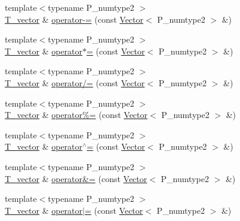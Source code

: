 \begin{DoxyCompactItemize}
\item 
{\footnotesize template$<$typename P\+\_\+numtype2 $>$ }\\\hyperlink{classTinyVector_aea08e4463006acf6842a93c026b27094}{T\+\_\+vector} \& \hyperlink{classTinyVector_ac94a05d4ad1b0984491aff7d99361f70}{operator-\/=} (const \hyperlink{classVector}{Vector}$<$ P\+\_\+numtype2 $>$ \&)
\item 
{\footnotesize template$<$typename P\+\_\+numtype2 $>$ }\\\hyperlink{classTinyVector_aea08e4463006acf6842a93c026b27094}{T\+\_\+vector} \& \hyperlink{classTinyVector_adc3770c333ef37d1e108a2470d3236f6}{operator$\ast$=} (const \hyperlink{classVector}{Vector}$<$ P\+\_\+numtype2 $>$ \&)
\item 
{\footnotesize template$<$typename P\+\_\+numtype2 $>$ }\\\hyperlink{classTinyVector_aea08e4463006acf6842a93c026b27094}{T\+\_\+vector} \& \hyperlink{classTinyVector_a18d3f9a7e30491c3a631a4b5ce657e62}{operator/=} (const \hyperlink{classVector}{Vector}$<$ P\+\_\+numtype2 $>$ \&)
\item 
{\footnotesize template$<$typename P\+\_\+numtype2 $>$ }\\\hyperlink{classTinyVector_aea08e4463006acf6842a93c026b27094}{T\+\_\+vector} \& \hyperlink{classTinyVector_addb9fdffcb8e617ce5fbd2da26d948f1}{operator\%=} (const \hyperlink{classVector}{Vector}$<$ P\+\_\+numtype2 $>$ \&)
\item 
{\footnotesize template$<$typename P\+\_\+numtype2 $>$ }\\\hyperlink{classTinyVector_aea08e4463006acf6842a93c026b27094}{T\+\_\+vector} \& \hyperlink{classTinyVector_a9905114dbb8b25db402b6f76af0bc317}{operator$^\wedge$=} (const \hyperlink{classVector}{Vector}$<$ P\+\_\+numtype2 $>$ \&)
\item 
{\footnotesize template$<$typename P\+\_\+numtype2 $>$ }\\\hyperlink{classTinyVector_aea08e4463006acf6842a93c026b27094}{T\+\_\+vector} \& \hyperlink{classTinyVector_a5245a217458cd60b82e921131a052b41}{operator\&=} (const \hyperlink{classVector}{Vector}$<$ P\+\_\+numtype2 $>$ \&)
\item 
{\footnotesize template$<$typename P\+\_\+numtype2 $>$ }\\\hyperlink{classTinyVector_aea08e4463006acf6842a93c026b27094}{T\+\_\+vector} \& \hyperlink{classTinyVector_a0f5a562314ad667688bb776969df18d6}{operator$\vert$=} (const \hyperlink{classVector}{Vector}$<$ P\+\_\+numtype2 $>$ \&)
\item 

\end{DoxyCompactItemize}
